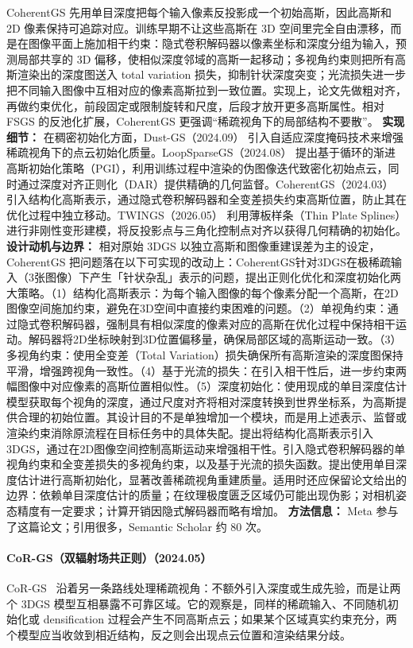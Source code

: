 CoherentGS 先用单目深度把每个输入像素反投影成一个初始高斯，因此高斯和 2D 像素保持可追踪对应。训练早期不让这些高斯在 3D 空间里完全自由漂移，而是在图像平面上施加相干约束：隐式卷积解码器以像素坐标和深度分组为输入，预测局部共享的 3D 偏移，使相似深度邻域的高斯一起移动；多视角约束则把所有高斯渲染出的深度图送入 total variation 损失，抑制针状深度突变；光流损失进一步把不同输入图像中互相对应的像素高斯拉到一致位置。实现上，论文先做粗对齐，再做约束优化，前段固定或限制旋转和尺度，后段才放开更多高斯属性。相对 FSGS 的反池化扩展，CoherentGS 更强调“稀疏视角下的局部结构不要散”。
\textbf{实现细节：} 在稠密初始化方面，Dust-GS（2024.09） 引入自适应深度掩码技术来增强稀疏视角下的点云初始化质量。LoopSparseGS（2024.08） 提出基于循环的渐进高斯初始化策略（PGI），利用训练过程中渲染的伪图像迭代致密化初始点云，同时通过深度对齐正则化（DAR）提供精确的几何监督。CoherentGS（2024.03） 引入结构化高斯表示，通过隐式卷积解码器和全变差损失约束高斯位置，防止其在优化过程中独立移动。TWINGS（2026.05） 利用薄板样条（Thin Plate Splines）进行非刚性变形建模，将反投影点与三角化控制点对齐以获得几何精确的初始化。
\textbf{设计动机与边界：} 相对原始 3DGS 以独立高斯和图像重建误差为主的设定，CoherentGS 把问题落在以下可实现的改动上：CoherentGS针对3DGS在极稀疏输入（3张图像）下产生「针状杂乱」表示的问题，提出正则化优化和深度初始化两大策略。（1）结构化高斯表示：为每个输入图像的每个像素分配一个高斯，在2D图像空间施加约束，避免在3D空间中直接约束困难的问题。（2）单视角约束：通过隐式卷积解码器，强制具有相似深度的像素对应的高斯在优化过程中保持相干运动。解码器将2D坐标映射到3D位置偏移量，确保局部区域的高斯运动一致。（3）多视角约束：使用全变差（Total Variation）损失确保所有高斯渲染的深度图保持平滑，增强跨视角一致性。（4）基于光流的损失：在引入相干性后，进一步约束两幅图像中对应像素的高斯位置相似性。（5）深度初始化：使用现成的单目深度估计模型获取每个视角的深度，通过尺度对齐将相对深度转换到世界坐标系，为高斯提供合理的初始位置。其设计目的不是单独增加一个模块，而是用上述表示、监督或渲染约束消除原流程在目标任务中的具体失配。提出将结构化高斯表示引入3DGS，通过在2D图像空间控制高斯运动来增强相干性。引入隐式卷积解码器的单视角约束和全变差损失的多视角约束，以及基于光流的损失函数。提出使用单目深度估计进行高斯初始化，显著改善稀疏视角重建质量。适用时还应保留论文给出的边界：依赖单目深度估计的质量；在纹理极度匮乏区域仍可能出现伪影；对相机姿态精度有一定要求；计算开销因隐式解码器而略有增加。
\textbf{方法信息：} Meta 参与了这篇论文；引用很多，Semantic Scholar 约 80 次。



\paragraph{CoR-GS（双辐射场共正则）（2024.05）}
CoR-GS~\cite{2405_12110} 沿着另一条路线处理稀疏视角：不额外引入深度或生成先验，而是让两个 3DGS 模型互相暴露不可靠区域。它的观察是，同样的稀疏输入、不同随机初始化或 densification 过程会产生不同高斯点云；如果某个区域真实约束充分，两个模型应当收敛到相近结构，反之则会出现点云位置和渲染结果分歧。

